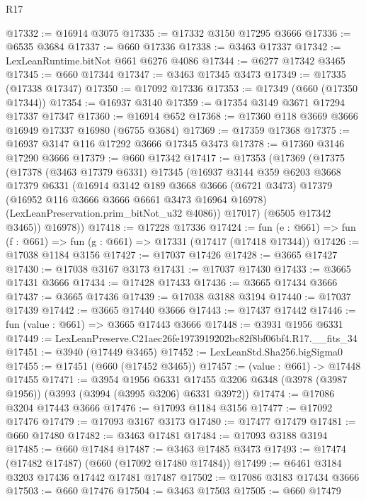 \begin{lexlean}{R17}
\begin{coremodule}
@17332 := @16914 @3075
@17335 := @17332 @3150 @17295 @3666
@17336 := @6535 @3684
@17337 := @660 @17336
@17338 := @3463 @17337
@17342 := LexLeanRuntime.bitNot @661 @6276 @4086
@17344 := @6277 @17342 @3465
@17345 := @660 @17344
@17347 := @3463 @17345 @3473
@17349 := @17335 (@17338 @17347)
@17350 := @17092 @17336
@17353 := @17349 (@660 (@17350 @17344))
@17354 := @16937 @3140
@17359 := @17354 @3149 @3671 @17294 @17337 @17347
@17360 := @16914 @652
@17368 := @17360 @118 @3669 @3666 @16949 @17337 @16980 (@6755 @3684)
@17369 := @17359 @17368
@17375 := @16937 @3147 @116 @17292 @3666 @17345 @3473
@17378 := @17360 @3146 @17290 @3666
@17379 := @660 @17342
@17417 := @17353
    (@17369
      (@17375
        (@17378
          (@3463 @17379 @6331)
          @17345
          (@16937
            @3144
            @359
            @6203
            @3668
            @17379
            @6331
            (@16914
              @3142
              @189
              @3668
              @3666
              (@6721 @3473)
              @17379
              (@16952 @116 @3666 @3666 @6661 @3473 @16964 @16978)
              (LexLeanPreservation.prim_bitNot_u32 @4086))
            @17017)
          (@6505 @17342 @3465))
        @16978))
@17418 := @17228 @17336
@17424 := fun (e : @661) => fun (f : @661) => fun (g : @661) => @17331 (@17417 (@17418 @17344))
@17426 := @17038 @1184 @3156
@17427 := @17037 @17426
@17428 := @3665 @17427
@17430 := @17038 @3167 @3173
@17431 := @17037 @17430
@17433 := @3665 @17431 @3666
@17434 := @17428 @17433
@17436 := @3665 @17434 @3666
@17437 := @3665 @17436
@17439 := @17038 @3188 @3194
@17440 := @17037 @17439
@17442 := @3665 @17440 @3666
@17443 := @17437 @17442
@17446 := fun (value : @661) => @3665 @17443 @3666
@17448 := @3931 @1956 @6331
@17449 := LexLeanPreserve.C21aec26fe1973919202bc82f8bf06bf4.R17.__fits_34
@17451 := @3940 (@17449 @3465)
@17452 := LexLeanStd.Sha256.bigSigma0
@17455 := @17451 (@660 (@17452 @3465))
@17457 := (value : @661) -> @17448 @17455
@17471 := @3954
    @1956
    @6331
    @17455
    @3206
    @6348
    (@3978 (@3987 @1956))
    (@3993 (@3994 (@3995 @3206) @6331 @3972))
@17474 := @17086 @3204 @17443 @3666
@17476 := @17093 @1184 @3156
@17477 := @17092 @17476
@17479 := @17093 @3167 @3173
@17480 := @17477 @17479
@17481 := @660 @17480
@17482 := @3463 @17481
@17484 := @17093 @3188 @3194
@17485 := @660 @17484
@17487 := @3463 @17485 @3473
@17493 := @17474 (@17482 @17487) (@660 (@17092 @17480 @17484))
@17499 := @6461 @3184 @3203 @17436 @17442 @17481 @17487
@17502 := @17086 @3183 @17434 @3666
@17503 := @660 @17476
@17504 := @3463 @17503
@17505 := @660 @17479

\end{coremodule}
\end{lexlean}
